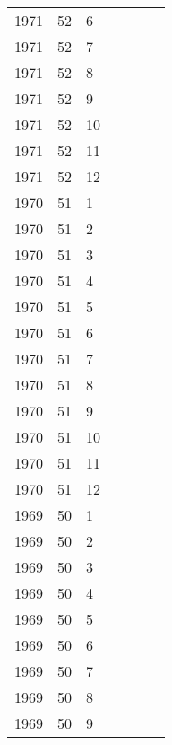 \begin{longtable}{ |l|l|l|l|p{2.7cm}|l|p{2cm}| }
 1971 & 52 &     6 &         &                &  & \\
 1971 & 52 &     7 &         &                &  & \\
 1971 & 52 &     8 &         &                &  & \\
 1971 & 52 &     9 &         &                &  & \\
 1971 & 52 &    10 &         &                &  & \\
 1971 & 52 &    11 &         &                &  & \\
 1971 & 52 &    12 &         &                &  & \\
 1970 & 51 &     1 &         &                &  & \\
 1970 & 51 &     2 &         &                &  & \\
 1970 & 51 &     3 &         &                &  & \\
 1970 & 51 &     4 &         &                &  & \\
 1970 & 51 &     5 &         &                &  & \\
 1970 & 51 &     6 &         &                &  & \\
 1970 & 51 &     7 &         &                &  & \\
 1970 & 51 &     8 &         &                &  & \\
 1970 & 51 &     9 &         &                &  & \\
 1970 & 51 &    10 &         &                &  & \\
 1970 & 51 &    11 &         &                &  & \\
 1970 & 51 &    12 &         &                &  & \\
 1969 & 50 &     1 &         &                &  & \\
 1969 & 50 &     2 &         &                &  & \\
 1969 & 50 &     3 &         &                &  & \\
 1969 & 50 &     4 &         &                &  & \\
 1969 & 50 &     5 &         &                &  & \\
 1969 & 50 &     6 &         &                &  & \\
 1969 & 50 &     7 &         &                &  & \\
 1969 & 50 &     8 &         &                &  & \\
 1969 & 50 &     9 &         &                &  & \\

\end{longtable}
